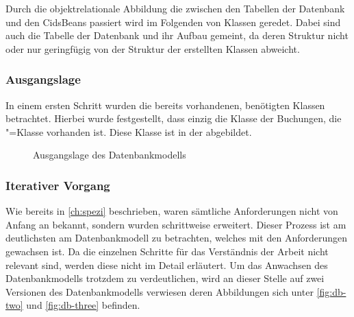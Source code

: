 Durch die objektrelationale Abbildung die zwischen den Tabellen der Datenbank und den CidsBeans passiert wird im Folgenden von Klassen geredet.
Dabei sind auch die Tabelle der Datenbank und ihr Aufbau gemeint, da deren Struktur nicht oder nur geringfügig von der Struktur der erstellten Klassen abweicht.

\subsubsection{Ausgangslage}
In einem ersten Schritt wurden die bereits vorhandenen, benötigten Klassen betrachtet. Hierbei wurde festgestellt, dass einzig die Klasse der Buchungen, die "=Klasse vorhanden ist. Diese Klasse ist in der  abgebildet.
\begin{figure}[htb]
	\centering
	\caption{Ausgangslage des Datenbankmodells}
	\label{fig:db-billing}
\end{figure}

\subsubsection{Iterativer Vorgang}
Wie bereits in \autoref{ch:spezi} beschrieben, waren sämtliche Anforderungen nicht von Anfang an bekannt, sondern wurden schrittweise erweitert.
Dieser Prozess ist am deutlichsten am Datenbankmodell zu betrachten, welches mit den Anforderungen gewachsen ist.
Da die einzelnen Schritte für das Verständnis der Arbeit nicht relevant sind, werden diese nicht im Detail erläutert.
Um das Anwachsen des Datenbankmodells trotzdem zu verdeutlichen, wird an dieser Stelle auf zwei Versionen des Datenbankmodells verwiesen deren Abbildungen sich unter \ref{fig:db-two} und \ref{fig:db-three} befinden.

